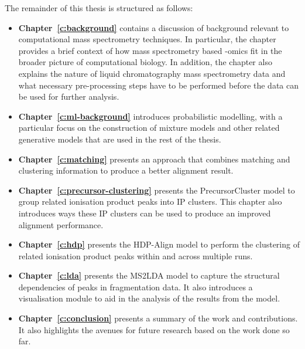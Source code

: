 The remainder of this thesis is structured as follows:

\begin{itemize}
\item \textbf{Chapter~\ref{c:background}} contains a discussion of background relevant to computational mass spectrometry techniques. In particular, the chapter provides a brief context of how mass spectrometry based -omics fit in the broader picture of computational biology. In addition, the chapter also explains the nature of liquid chromatography mass spectrometry data and what necessary pre-processing steps have to be performed before the data can be used for further analysis.
\item \textbf{Chapter~\ref{c:ml-background}} introduces probabilistic modelling, with a particular focus on the construction of mixture models and other related generative models that are used in the rest of the thesis.
\item \textbf{Chapter~\ref{c:matching}} presents an approach that combines matching and clustering information to produce a better alignment result.
\item \textbf{Chapter~\ref{c:precursor-clustering}} presents the PrecursorCluster model to group related ionisation product peaks into IP clusters. This chapter also introduces ways these IP clusters can be used to produce an improved alignment performance.
\item \textbf{Chapter~\ref{c:hdp}} presents the HDP-Align model to perform the clustering of related ionisation product peaks within and across multiple runs. 
\item \textbf{Chapter~\ref{c:lda}} presents the MS2LDA model to capture the structural dependencies of peaks in fragmentation data. It also introduces a visualisation module to aid in the analysis of the results from the model. 
\item \textbf{Chapter~\ref{c:conclusion}} presents a summary of the work and contributions. It also highlights the avenues for future research based on the work done so far. 
\end{itemize}